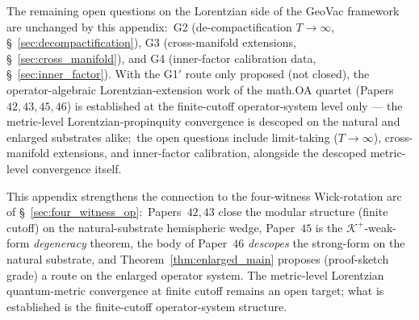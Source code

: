 \documentclass[11pt,a4paper]{article}
\theoremstyle{plain}
\theoremstyle{definition}
\newcommand{\Krein}{\mathcal{K}}
\newcommand{\Kplus}{\Krein^{+}}
\begin{document}
The remaining open questions on the Lorentzian side of the GeoVac
framework are unchanged by this appendix:\ G2 (de-compactification
$T \to \infty$, \S~\ref{sec:decompactification}), G3
(cross-manifold extensions, \S~\ref{sec:cross_manifold}), and G4
(inner-factor calibration data, \S~\ref{sec:inner_factor}). With the
G1$'$ route only proposed (not closed), the operator-algebraic
Lorentzian-extension work of the math.OA quartet (Papers~$42, 43, 45,
46$) is established at the finite-cutoff operator-system level only ---
the metric-level Lorentzian-propinquity convergence is descoped on the
natural and enlarged substrates alike;\
the open questions include limit-taking ($T \to \infty$),
cross-manifold extensions, and inner-factor calibration, alongside the
descoped metric-level convergence itself.

This appendix strengthens the connection to the four-witness
Wick-rotation arc of \S~\ref{sec:four_witness_op}:\ Papers~$42, 43$
close the modular structure (finite cutoff) on the natural-substrate
hemispheric wedge, Paper~$45$ is the $\Kplus$-weak-form
\emph{degeneracy} theorem, the body
of Paper~$46$ \emph{descopes} the strong-form on the natural substrate,
and Theorem~\ref{thm:enlarged_main} proposes (proof-sketch grade) a
route on the enlarged operator system. The metric-level Lorentzian
quantum-metric convergence at finite cutoff remains an open target;
what is established is the finite-cutoff operator-system structure.
\end{document}
